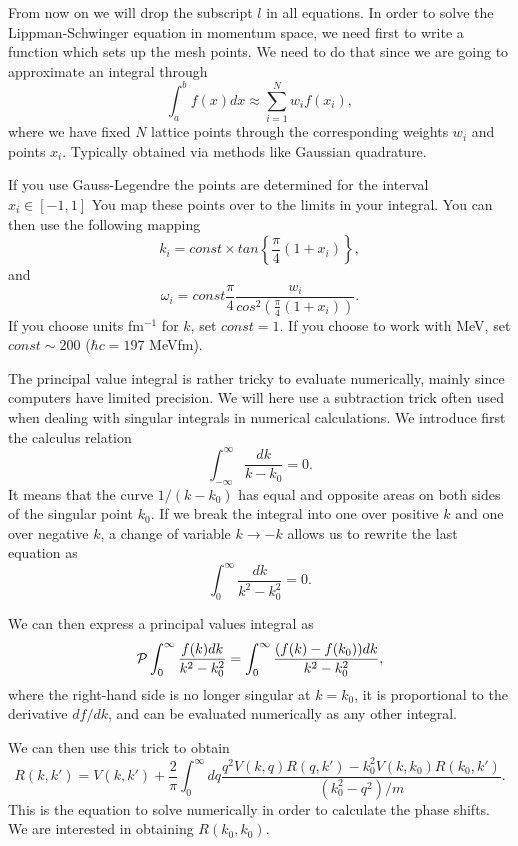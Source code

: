\documentclass[%
oneside,                 %
final,                   %
10pt]{article}
\begin{document}
From now on we will drop the subscript $l$ in all equations.
In order to solve the Lippman-Schwinger equation 
in momentum space, we need first to write 
a function which sets up the mesh points. 
We need to do that since we are going to approximate an integral
through 
\[
   \int_a^bf(x)dx\approx\sum_{i=1}^Nw_if(x_i),
\]
where we have fixed $N$ lattice points through the corresponding weights
$w_i$ and points $x_i$. Typically obtained via methods like Gaussian quadrature.

If you use Gauss-Legendre the points are determined for the interval $x_i\in [-1,1]$
You map these points over to the limits in your integral. You can then
use the following mapping
\[
  k_i=const\times tan\left\{\frac{\pi}{4}(1+x_i)\right\},
\]
and 
\[
   \omega_i= const\frac{\pi}{4}\frac{w_i}{cos^2\left(\frac{\pi}{4}(1+x_i)\right)}.
\]
If you choose units fm$^{-1}$ for $k$, set $const=1$. If you choose to work
with MeV, set $const\sim 200$ ($\hbar c=197$ MeVfm).

The principal value integral is rather tricky
to evaluate numerically, mainly since computers have limited
precision. We will here use a subtraction trick often used
when dealing with singular integrals in numerical calculations.
We introduce first the calculus relation
\[
  \int_{-\infty}^{\infty} \frac{dk}{k-k_0} =0.
\]
It means that the curve $1/(k-k_0)$ has equal and opposite
areas on both sides of the singular point $k_0$. If we break
the integral into one over positive $k$ and one over 
negative $k$, a change of variable $k\rightarrow -k$ 
allows us to rewrite the last equation as
\[
  \int_{0}^{\infty} \frac{dk}{k^2-k_0^2} =0.
\]

We can then express a principal values integral
as
\begin{equation}
  {\cal P}\int_{0}^{\infty} \frac{f(k)dk}{k^2-k_0^2} =
  \int_{0}^{\infty} \frac{(f(k)-f(k_0))dk}{k^2-k_0^2},
   \label{eq:trick}
\end{equation}
where the right-hand side is no longer singular at 
$k=k_0$, it is proportional to the derivative $df/dk$,
and can be evaluated numerically as any other integral.

We can then use this trick to obtain
\begin{equation}
    R(k,k') = V(k,k') +\frac{2}{\pi}
                \int_0^{\infty}dq
                \frac{q^2V(k,q)R(q,k')-k_0^2V(k,k_0)R(k_0,k')  }
                     {(k_0^2-q^2)/m}.
   \label{eq:ls2}
\end{equation}
This is the equation to solve numerically in order
to calculate the phase shifts. We are interested in obtaining
$R(k_0,k_0)$.
\end{document}

